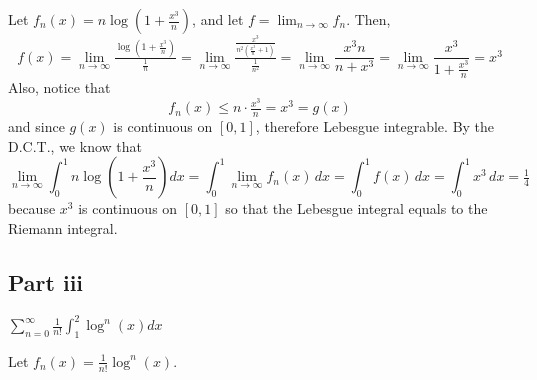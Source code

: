 \begin{answer}
        Let $f_n(x) = n \log \left(1+\frac{x^3}{n}\right)$, and let $f = \lim_{n\to \infty} f_n$. Then,
        \begin{equation}
                f(x) = \lim_{n\to \infty} \tfrac{\log\left(1+\frac{x^3}{n}\right)}{\frac{1}{n}}
                = \lim_{n\to\infty}\tfrac{\frac{x^3}{n^2\left(\frac{x^3}{n}+1\right)}}{\frac{1}{n^2}}
                = \lim_{n\to\infty}\frac{x^3 n}{n+x^3}
                = \lim_{n\to\infty}\frac{x^3}{1+\frac{x^3}{n}}
                = x^3
        \end{equation}
        Also, notice that
        \begin{equation}
            f_n(x) \leq n \cdot \tfrac{x^3}{n} = x^3 = g(x)
        \end{equation}
        and since $g(x)$ is continuous on $[0,1]$, therefore Lebesgue integrable. By the D.C.T., we know that
        \begin{equation}
            \lim _{n \rightarrow \infty} \int_0^1 n \log \left(1+\frac{x^3}{n}\right) d x = \int_0^1 \lim_{n \to \infty} f_n(x) \,dx = \int_0^1 f(x) \,dx = \int_0^1 x^3 \,dx = \tfrac{1}{4}
        \end{equation}
        because $x^3$ is continuous on $[0,1]$ so that the Lebesgue integral equals to the Riemann integral.
\end{answer}

\subsection{Part iii}

\begin{question}
   $\sum_{n=0}^{\infty} \frac{1}{n !} \int_1^2 \log ^n (x) d x$
\end{question}

\begin{answer}
   Let $f_n(x) = \tfrac{1}{n!} \log^n(x)$.
\end{answer}